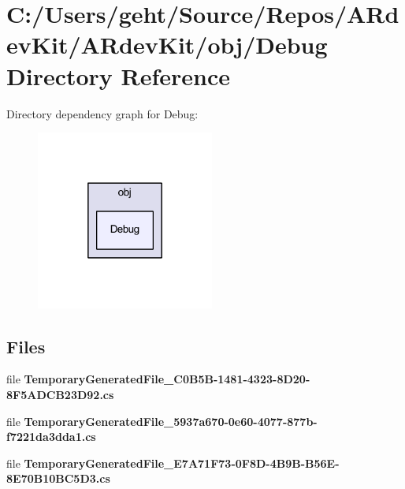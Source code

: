 \section{C\-:/\-Users/geht/\-Source/\-Repos/\-A\-Rdev\-Kit/\-A\-Rdev\-Kit/obj/\-Debug Directory Reference}
\label{dir_2716d902a35c73f4143d3e2b27e2543e}
Directory dependency graph for Debug\-:
\nopagebreak
\begin{figure}[H]
\begin{center}
\leavevmode
\includegraphics[width=166pt]{dir_2716d902a35c73f4143d3e2b27e2543e_dep}
\end{center}
\end{figure}
\subsection*{Files}
\begin{DoxyCompactItemize}
\item 
file {\bfseries Temporary\-Generated\-File\-\_\-C0\-B5\-B-\/1481-\/4323-\/8\-D20-\/8\-F5\-A\-D\-C\-B23\-D92.\-cs}
\item 
file {\bfseries Temporary\-Generated\-File\-\_\-5937a670-\/0e60-\/4077-\/877b-\/f7221da3dda1.\-cs}
\item 
file {\bfseries Temporary\-Generated\-File\-\_\-\-E7\-A71\-F73-\/0\-F8\-D-\/4\-B9\-B-\/\-B56\-E-\/8\-E70\-B10\-B\-C5\-D3.\-cs}
\end{DoxyCompactItemize}
